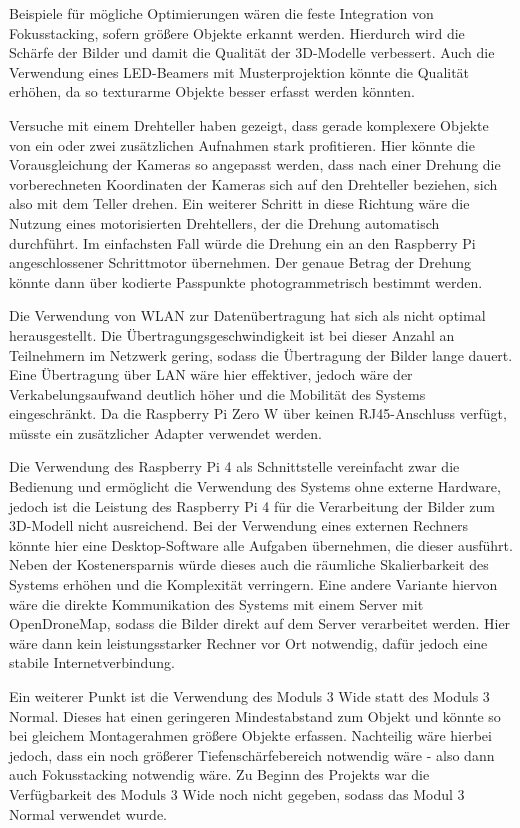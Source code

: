 \documentclass[./00PhotoBox.tex]{subfiles}
\begin{document}
Beispiele für mögliche Optimierungen wären die feste Integration von Fokusstacking, sofern größere Objekte erkannt werden. Hierdurch wird die Schärfe der Bilder und damit die Qualität der 3D-Modelle verbessert. Auch die Verwendung eines LED-Beamers mit Musterprojektion könnte die Qualität erhöhen, da so texturarme Objekte besser erfasst werden könnten.

Versuche mit einem Drehteller haben gezeigt, dass gerade komplexere Objekte von ein oder zwei zusätzlichen Aufnahmen stark profitieren. Hier könnte die Vorausgleichung der Kameras so angepasst werden, dass nach einer Drehung die vorberechneten Koordinaten der Kameras sich auf den Drehteller beziehen, sich also mit dem Teller drehen. Ein weiterer Schritt in diese Richtung wäre die Nutzung eines motorisierten Drehtellers, der die Drehung automatisch durchführt. Im einfachsten Fall würde die Drehung ein an den Raspberry Pi angeschlossener Schrittmotor übernehmen. Der genaue Betrag der Drehung könnte dann über kodierte Passpunkte photogrammetrisch bestimmt werden.

Die Verwendung von WLAN zur Datenübertragung hat sich als nicht optimal herausgestellt. Die Übertragungsgeschwindigkeit ist bei dieser Anzahl an Teilnehmern im Netzwerk gering, sodass die Übertragung der Bilder lange dauert. Eine Übertragung über LAN wäre hier effektiver, jedoch wäre der Verkabelungsaufwand deutlich höher und die Mobilität des Systems eingeschränkt. Da die Raspberry Pi Zero W über keinen RJ45-Anschluss verfügt, müsste ein zusätzlicher Adapter verwendet werden.

Die Verwendung des Raspberry Pi 4 als Schnittstelle vereinfacht zwar die Bedienung und ermöglicht die Verwendung des Systems ohne externe Hardware, jedoch ist die Leistung des Raspberry Pi 4 für die Verarbeitung der Bilder zum 3D-Modell nicht ausreichend. Bei der Verwendung eines externen Rechners könnte hier eine Desktop-Software alle Aufgaben übernehmen, die dieser ausführt. Neben der Kostenersparnis würde dieses auch die räumliche Skalierbarkeit des Systems erhöhen und die Komplexität verringern. Eine andere Variante hiervon wäre die direkte Kommunikation des Systems mit einem Server mit OpenDroneMap, sodass die Bilder direkt auf dem Server verarbeitet werden. Hier wäre dann kein leistungsstarker Rechner vor Ort notwendig, dafür jedoch eine stabile Internetverbindung.

Ein weiterer Punkt ist die Verwendung des Moduls 3 Wide statt des Moduls 3 Normal. Dieses hat einen geringeren Mindestabstand zum Objekt und könnte so bei gleichem Montagerahmen größere Objekte erfassen. Nachteilig wäre hierbei jedoch, dass ein noch größerer Tiefenschärfebereich notwendig wäre - also dann auch Fokusstacking notwendig wäre. Zu Beginn des Projekts war die Verfügbarkeit des Moduls 3 Wide noch nicht gegeben, sodass das Modul 3 Normal verwendet wurde.




\biblio
\end{document}
